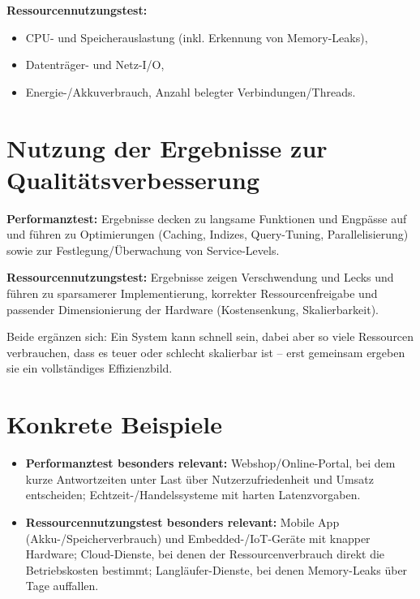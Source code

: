 \documentclass[
	fontsize=12pt,          %
	paper=a4,               %
	numbers=noenddot,       %
	listof=totoc,           %
	listof=entryprefix,     %
	listof=nochaptergap,    %
	bibliography=totoc,     %
	parskip=half,           %
	openany                 %
]{scrbook}
\begin{document}
\textbf{Ressourcennutzungstest:}
\begin{itemize}
	\item CPU- und Speicherauslastung (inkl. Erkennung von Memory-Leaks),
	\item Datenträger- und Netz-I/O,
	\item Energie-/Akkuverbrauch, Anzahl belegter Verbindungen/Threads.
\end{itemize}

\section*{Nutzung der Ergebnisse zur Qualitätsverbesserung}

\textbf{Performanztest:} Ergebnisse decken zu langsame Funktionen und Engpässe
auf und führen zu Optimierungen (Caching, Indizes, Query-Tuning, Parallelisierung)
sowie zur Festlegung/Überwachung von Service-Levels.

\textbf{Ressourcennutzungstest:} Ergebnisse zeigen Verschwendung und Lecks und
führen zu sparsamerer Implementierung, korrekter Ressourcenfreigabe und
passender Dimensionierung der Hardware (Kostensenkung, Skalierbarkeit).

Beide ergänzen sich: Ein System kann schnell sein, dabei aber so viele Ressourcen
verbrauchen, dass es teuer oder schlecht skalierbar ist -- erst gemeinsam
ergeben sie ein vollständiges Effizienzbild.

\section*{Konkrete Beispiele}

\begin{itemize}
	\item \textbf{Performanztest besonders relevant:} Webshop/Online-Portal, bei
	      dem kurze Antwortzeiten unter Last über Nutzerzufriedenheit und Umsatz
	      entscheiden; Echtzeit-/Handelssysteme mit harten Latenzvorgaben.
	\item \textbf{Ressourcennutzungstest besonders relevant:} Mobile App
	      (Akku-/Speicherverbrauch) und Embedded-/IoT-Geräte mit knapper
	      Hardware; Cloud-Dienste, bei denen der Ressourcenverbrauch direkt die
	      Betriebskosten bestimmt; Langläufer-Dienste, bei denen Memory-Leaks
	      über Tage auffallen.
\end{itemize}
\end{document}
